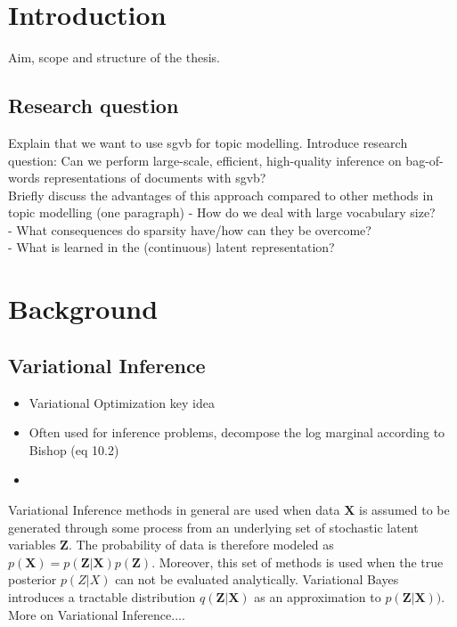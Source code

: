 \documentclass{report}
\begin{document}
\tableofcontents

\doublespacing
\chapter{Introduction}
Aim, scope and structure of the thesis. 
\section{Research question}
Explain that we want to use sgvb for topic modelling. Introduce research question:
Can we perform large-scale, efficient, high-quality inference on bag-of-words representations of documents with sgvb? \\
Briefly discuss the advantages of this approach compared to other methods in topic modelling (one paragraph)
-	How do we deal with large vocabulary size?\\
-	What consequences do sparsity have/how can they be overcome? \\
-	What is learned in the (continuous) latent representation?



\pagebreak 
\nocite{*}


\chapter{Background}
\section{Variational Inference}
\begin{itemize}
	\item Variational Optimization key idea
	\item Often used for inference problems, decompose the log marginal according to Bishop (eq 10.2)
	\item 
\end{itemize}
Variational Inference methods in general are used when data $\mathbf{X}$ is assumed to be generated through some process from an underlying set of stochastic latent variables $\mathbf{Z}$. The probability of data is therefore modeled as $p(\mathbf{X}) = p(\mathbf{Z}|\mathbf{X})p(\mathbf{Z})$. Moreover, this set of methods is used when the true posterior $p(Z|X)$ can not be evaluated analytically. Variational Bayes introduces a tractable distribution $q(\mathbf{\mathbf{Z}|\mathbf{X}})$ as an approximation to $p(\mathbf{Z}|\mathbf{X}))$.
\\
More on Variational Inference....
\end{document}
